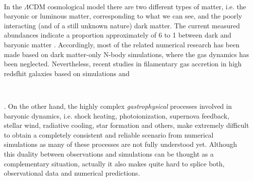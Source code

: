 \documentclass[a4,useAMS,usenatbib,usegraphicx,12pt]{article}
\begin{document}
\

In the $\Lambda$CDM cosmological model there are two different types of 
matter, i.e. the baryonic or luminous matter, corresponding to what we can see, 
and the poorly interacting (and of a still unknown nature) dark matter. The 
current measured abundances indicate a proportion approximately of 6 to 1 
between dark and baryonic matter \citep{Planck13XVI}. Accordingly, most of the 
related numerical research has been made based on dark matter-only N-body 
simulations, where the gas dynamics has been neglected. Nevertheless, recent
studies in filamentary gas accretion in high redsfhit galaxies based on 
simulations \citep{Dekel09} and 

\


. On the other hand, the highly complex \textit{gastrophysical} 
processes involved in baryonic dynamics, i.e. shock heating, photoionization, 
supernova feedback, stellar wind, radiative cooling, star formation and others, 
make extremely difficult to obtain a completely consistent and reliable scenario 
from numerical simulations as many of these processes are not fully understood 
yet. 
Although this duality between observations and simulations can be thought as a 
complementary situation, actually it also makes quite hard to splice both, 
observational data and numerical predictions.

\
\end{document}
